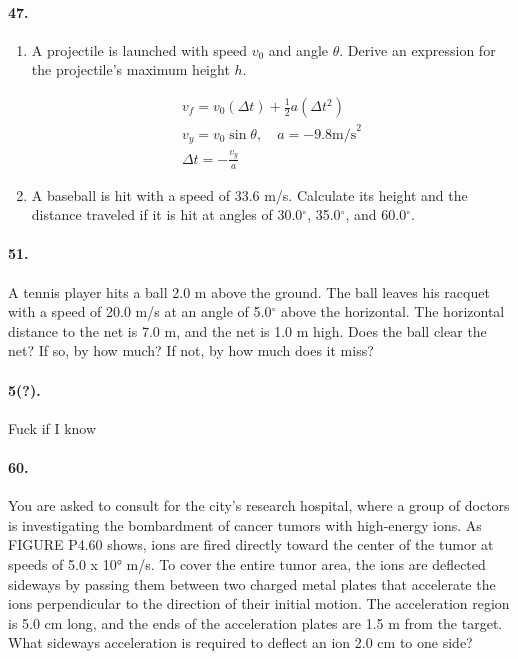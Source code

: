     \paragraph*{47.}
    \begin{enumerate}[label=\alph*.]
        \item A projectile is launched with speed $v_0$ and angle $\theta$. Derive an expression for the projectile's maximum height $h$.
        
        \begin{mdframed}
            \begin{equation*}
                \begin{gathered}
                    v_f = v_0(\Delta t) + \frac{1}{2}a(\Delta t^2)          \\
                    v_y = v_0\sin\theta, \quad a = -9.8 \text{m/s}^2        \\
                    \Delta t = -\frac{v_y}{a}
                \end{gathered}
            \end{equation*}
        \end{mdframed}

        \item A baseball is hit with a speed of 33.6 m/s. Calculate its height and the distance traveled if it is hit at angles of 30.0$^\circ$, 35.0$^\circ$, and 60.0$^\circ$.
    \end{enumerate}

    \paragraph*{51.}
    A tennis player hits a ball 2.0 m above the ground. The ball leaves his racquet with a speed of 20.0 m/s at an angle of 5.0$^\circ$  above the horizontal. The horizontal distance to the net is 7.0 m, and the net is 1.0 m high. Does the ball clear the net? If so, by how much? If not, by how much does it miss?

    \paragraph*{5(?).}
    Fuck if I know

    \paragraph*{60.}
    You are asked to consult for the city's research hospital, where a group of doctors is investigating the bombardment of cancer tumors with high-energy ions. As FIGURE P4.60 shows, ions are fired directly toward the center of the tumor at speeds of 5.0 x 10° m/s. To cover the entire tumor area, the ions are deflected sideways by passing them between two charged metal plates that accelerate the ions perpendicular to the direction of their initial motion. The acceleration region is 5.0 cm long, and the ends of the acceleration plates are 1.5 m from the target. What sideways acceleration is required to deflect an ion 2.0 cm to one side?

